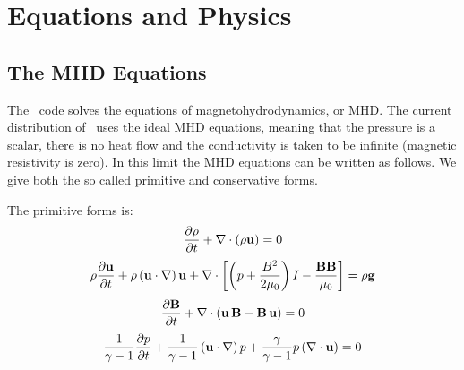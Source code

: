 \chapter{Equations and Physics \label{chapter:equations}}

\section{The MHD Equations \label{section:mhd}}
The \BATSRUS\ code solves the equations of
magnetohydrodynamics, or MHD.  The current distribution of \BATSRUS\
uses the ideal MHD equations, meaning that the pressure is a scalar,
there is no heat flow and the conductivity is taken to be infinite
(magnetic resistivity is zero).  In this limit the MHD equations can be
written as follows.  We give both the so called primitive and
conservative forms.

The primitive forms is:
\begin{equation}
\label{eq:continuity_primative}
\frac{\partial \rho}{\partial t} + \nabla\cdot \left(\rho {\bf u}\right)
= 0
\end{equation}
\begin{equation}
\label{eq:momentum_primative}
\rho \frac{\partial {\bf u}}{\partial t} + \rho\left({\bf u}\cdot
\nabla\right){\bf u} + \nabla \cdot \left[\left( p + \frac{B^2}{2
\mu_0}\right)I
-\frac{\bf BB}{\mu_0}\right] = \rho {\bf g}
\end{equation}
\begin{equation}
\label{eq:bfield_primative}
\frac{\partial {\bf B}}{\partial t} + \nabla\cdot\left({\bf u\,B} - {\bf
B\,u}\right) = 0
\end{equation}
\begin{equation}
\label{eq:pressure_primative}
\frac{1}{\gamma-1} \frac{\partial p}{\partial t} + \frac{1}{\gamma-1}
\left({\bf u}\cdot \nabla\right)p + \frac{\gamma}{\gamma-1}
p \left(\nabla \cdot {\bf u}\right) = 0
\end{equation}

